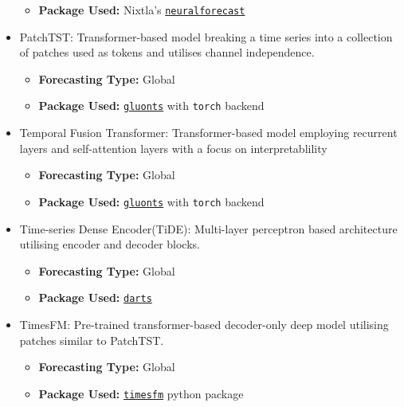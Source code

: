 \documentclass{article}
\begin{document}
\begin{itemize}
\begin{itemize}
        \item \textbf{Package Used: }Nixtla's \texttt{\href{https://nixtlaverse.nixtla.io/neuralforecast/models.informer.html}{neuralforecast}}
    \end{itemize}
    \item PatchTST: Transformer-based model breaking a time series into a collection of patches used as tokens and utilises channel independence\cite{Nie2022}.
    \begin{itemize}
        \item \textbf{Forecasting Type: }Global
        \item \textbf{Package Used: }\texttt{\href{https://ts.gluon.ai/stable/api/gluonts/gluonts.torch.model.patch_tst.html}{gluonts}} with \texttt{torch} backend
    \end{itemize}
    \item Temporal Fusion Transformer: Transformer-based model employing recurrent layers and self-attention layers with a focus on interpretablility\cite{Lim2021}
    \begin{itemize}
        \item \textbf{Forecasting Type: }Global
        \item \textbf{Package Used: }\texttt{\href{https://ts.gluon.ai/stable/api/gluonts/gluonts.torch.model.tft.module.html}{gluonts}} with \texttt{torch} backend
    \end{itemize}
    \item Time-series Dense Encoder(TiDE): Multi-layer perceptron based architecture utilising encoder and decoder blocks\cite{Das2023a}.
    \begin{itemize}
        \item \textbf{Forecasting Type: }Global
        \item \textbf{Package Used: }\texttt{\href{https://unit8co.github.io/darts/generated_api/darts.models.forecasting.tide_model.html}{darts}}
    \end{itemize}
    \item TimesFM: Pre-trained transformer-based decoder-only deep model utilising patches similar to PatchTST\cite{Das2023}.
    \begin{itemize}
        \item \textbf{Forecasting Type: }Global
        \item \textbf{Package Used: }\texttt{\href{https://github.com/google-research/timesfm}{timesfm}} python package
    \end{itemize}
\end{itemize}
\end{document}
